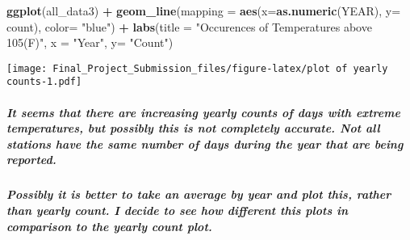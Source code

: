 \documentclass[]{article}
\newenvironment{Shaded}{\begin{snugshade}}{\end{snugshade}}
\newcommand{\DataTypeTok}[1]{\textcolor[rgb]{0.13,0.29,0.53}{#1}}
\newcommand{\KeywordTok}[1]{\textcolor[rgb]{0.13,0.29,0.53}{\textbf{#1}}}
\newcommand{\NormalTok}[1]{#1}
\newcommand{\OperatorTok}[1]{\textcolor[rgb]{0.81,0.36,0.00}{\textbf{#1}}}
\newcommand{\StringTok}[1]{\textcolor[rgb]{0.31,0.60,0.02}{#1}}
\let\oldsubparagraph\subparagraph
\renewcommand{\subparagraph}[1]{\oldsubparagraph{#1}\mbox{}}
\begin{document}
\begin{Shaded}
\begin{Highlighting}[]
\KeywordTok{ggplot}\NormalTok{(all_data3) }\OperatorTok{+}
\StringTok{  }\KeywordTok{geom_line}\NormalTok{(}\DataTypeTok{mapping =} \KeywordTok{aes}\NormalTok{(}\DataTypeTok{x=}\KeywordTok{as.numeric}\NormalTok{(YEAR), }\DataTypeTok{y=}\NormalTok{ count), }\DataTypeTok{color=} \StringTok{"blue"}\NormalTok{) }\OperatorTok{+}
\StringTok{  }\KeywordTok{labs}\NormalTok{(}\DataTypeTok{title =} \StringTok{"Occurences of Temperatures above 105(F)"}\NormalTok{, }\DataTypeTok{x =} \StringTok{"Year"}\NormalTok{, }\DataTypeTok{y=} \StringTok{"Count"}\NormalTok{)}
\end{Highlighting}
\end{Shaded}

\texttt{[image: Final\_Project\_Submission\_files/figure-latex/plot of yearly counts-1.pdf]}

\hypertarget{it-seems-that-there-are-increasing-yearly-counts-of-days-with-extreme-temperatures-but-possibly-this-is-not-completely-accurate.-not-all-stations-have-the-same-number-of-days-during-the-year-that-are-being-reported.}{%
\subparagraph{It seems that there are increasing yearly counts of days
with extreme temperatures, but possibly this is not completely accurate.
Not all stations have the same number of days during the year that are
being
reported.}\label{it-seems-that-there-are-increasing-yearly-counts-of-days-with-extreme-temperatures-but-possibly-this-is-not-completely-accurate.-not-all-stations-have-the-same-number-of-days-during-the-year-that-are-being-reported.}}

\hypertarget{possibly-it-is-better-to-take-an-average-by-year-and-plot-this-rather-than-yearly-count.-i-decide-to-see-how-different-this-plots-in-comparison-to-the-yearly-count-plot.}{%
\subparagraph{Possibly it is better to take an average by year and plot
this, rather than yearly count. I decide to see how different this plots
in comparison to the yearly count
plot.}\label{possibly-it-is-better-to-take-an-average-by-year-and-plot-this-rather-than-yearly-count.-i-decide-to-see-how-different-this-plots-in-comparison-to-the-yearly-count-plot.}}
\end{document}
